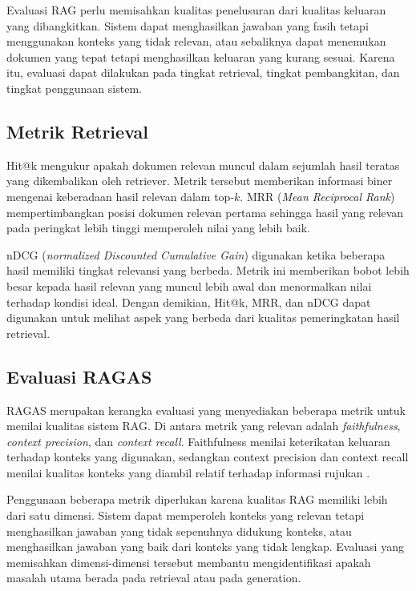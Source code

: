 Evaluasi RAG perlu memisahkan kualitas penelusuran dari kualitas keluaran yang dibangkitkan. Sistem dapat menghasilkan jawaban yang fasih tetapi menggunakan konteks yang tidak
relevan, atau sebaliknya dapat menemukan dokumen yang tepat tetapi menghasilkan keluaran yang kurang sesuai. Karena itu, evaluasi dapat dilakukan pada tingkat retrieval,
tingkat pembangkitan, dan tingkat penggunaan sistem.

\subsection{Metrik Retrieval}
\label{subsec:bab2-metrik-retrieval}

Hit@k mengukur apakah dokumen relevan muncul dalam sejumlah hasil teratas yang dikembalikan oleh retriever. Metrik tersebut memberikan informasi biner mengenai keberadaan
hasil relevan dalam top-$k$. MRR (\textit{Mean Reciprocal Rank}) mempertimbangkan posisi dokumen relevan pertama sehingga hasil yang relevan pada peringkat lebih tinggi
memperoleh nilai yang lebih baik.

nDCG (\textit{normalized Discounted Cumulative Gain}) digunakan ketika beberapa hasil memiliki tingkat relevansi yang berbeda. Metrik ini memberikan bobot lebih besar kepada
hasil relevan yang muncul lebih awal dan menormalkan nilai terhadap kondisi ideal. Dengan demikian, Hit@k, MRR, dan nDCG dapat digunakan untuk melihat aspek yang berbeda dari
kualitas pemeringkatan hasil retrieval.

\subsection{Evaluasi RAGAS}
\label{subsec:bab2-ragas}

RAGAS merupakan kerangka evaluasi yang menyediakan beberapa metrik untuk menilai kualitas sistem RAG. Di antara metrik yang relevan adalah \textit{faithfulness},
\textit{context precision}, dan \textit{context recall}. Faithfulness menilai keterikatan keluaran terhadap konteks yang digunakan, sedangkan context precision dan context
recall menilai kualitas konteks yang diambil relatif terhadap informasi rujukan \parencite{es2023}.

Penggunaan beberapa metrik diperlukan karena kualitas RAG memiliki lebih dari satu dimensi. Sistem dapat memperoleh konteks yang relevan tetapi menghasilkan jawaban yang tidak
sepenuhnya didukung konteks, atau menghasilkan jawaban yang baik dari konteks yang tidak lengkap. Evaluasi yang memisahkan dimensi-dimensi tersebut membantu mengidentifikasi
apakah masalah utama berada pada retrieval atau pada generation.

